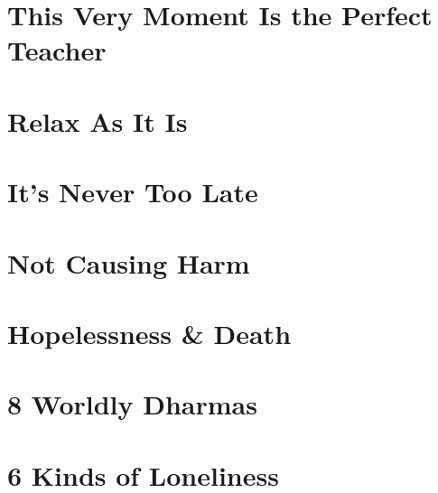 \documentclass[oneside]{book}
\numberwithin{equation}{section}
\begin{document}

\section{This Very Moment Is the Perfect Teacher}


\section{Relax As It Is}


\section{It's Never Too Late}


\section{Not Causing Harm}


\section{Hopelessness \& Death}


\section{8 Worldly Dharmas}


\section{6 Kinds of Loneliness}

\end{document}
